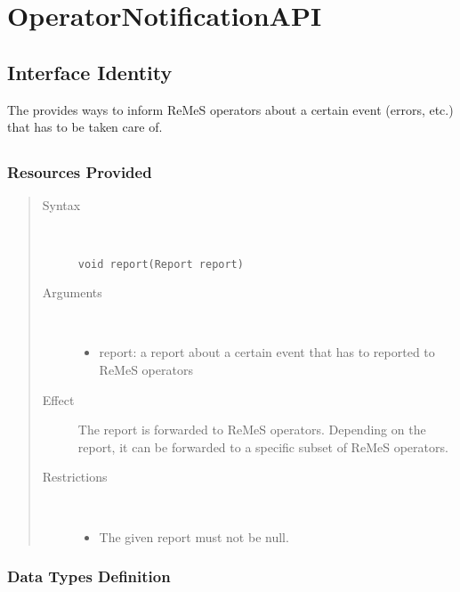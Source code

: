 \section{OperatorNotificationAPI}

\subsection{Interface Identity}

\npar The  provides ways to inform ReMeS
operators about a certain event (errors, etc.) that has to be taken care
of.

\subsection{}

\subsubsection{Resources Provided}

\begin{quote}
	\begin{description}
		\item[Syntax] \
		\begin{verbatim}
void report(Report report)
		\end{verbatim}
		\item[Arguments] \
		\begin{itemize}
			\item report: a report about a certain event that has to reported to ReMeS
			operators
		\end{itemize}
		\item[Effect] The report is forwarded to ReMeS operators. Depending on the
		report, it can be forwarded to a specific subset of ReMeS operators. 
		\item[Restrictions] \
		\begin{itemize}
			\item The given report must not be null.
		\end{itemize}
	\end{description} 
\end{quote}

\subsubsection{Data Types Definition}


